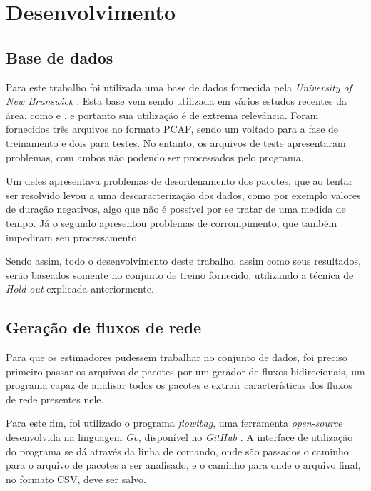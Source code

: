 \chapter{Desenvolvimento}
\label{c.desenvolvimento}

\section{Base de dados}

Para este trabalho foi utilizada uma base de dados fornecida pela \textit{University of New Brunswick} \cite{unbdataset}. Esta base vem sendo utilizada em vários estudos recentes da área, como \cite{iscx1} e \cite{rna1}, e portanto sua utilização é de extrema relevância. Foram fornecidos três arquivos no formato PCAP, sendo um voltado para a fase de treinamento e dois para testes. No entanto, os arquivos de teste apresentaram problemas, com ambos não podendo ser processados pelo programa.

Um deles apresentava problemas de desordenamento dos pacotes, que ao tentar ser resolvido levou a uma descaracterização dos dados, como por exemplo valores de duração negativos, algo que não é possível por se tratar de uma medida de tempo. Já o segundo apresentou problemas de corrompimento, que também impediram seu processamento.

Sendo assim, todo o desenvolvimento deste trabalho, assim como seus resultados, serão baseados somente no conjunto de treino fornecido, utilizando a técnica de \textit{Hold-out} explicada anteriormente.

\section{Geração de fluxos de rede}
\label{d.fluxo}

Para que os estimadores pudessem trabalhar no conjunto de dados, foi preciso primeiro passar os arquivos de pacotes por um gerador de fluxos bidirecionais, um programa capaz de analisar todos os pacotes e extrair características dos fluxos de rede presentes nele.

Para este fim, foi utilizado o programa \textit{flowtbag}, uma ferramenta \textit{open-source} desenvolvida na linguagem \textit{Go}, disponível no \textit{GitHub} \cite{flowtbag}. A interface de utilização do programa se dá através da linha de comando, onde são passados o caminho para o arquivo de pacotes a ser analisado, e o caminho para onde o arquivo final, no formato CSV, deve ser salvo.

